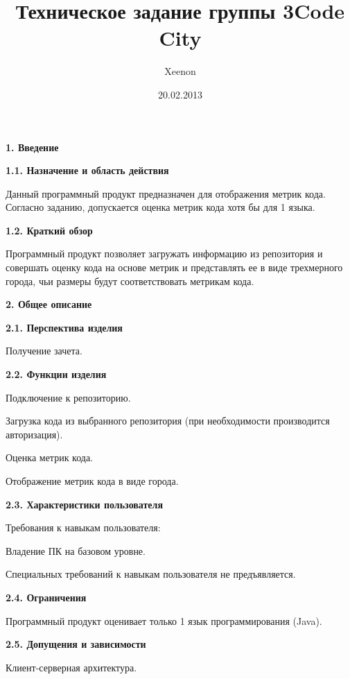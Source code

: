\documentclass[a4paper,12pt]{article}
\title{Техническое задание группы 3\newline Code City }
\date{20.02.2013}
\author{Xeenon}
\begin{document}
\maketitle
\newpage
\textbf{1. Введение}
\newline

	\textbf{1.1. Назначение и область действия}
	
		Данный программный продукт предназначен для отображения метрик кода.
		Согласно заданию, допускается оценка метрик кода хотя бы для 1 языка.
	\newline	

	\textbf{1.2. Краткий обзор}
	
		Программный продукт позволяет загружать информацию из репозитория и совершать оценку кода на основе метрик и представлять ее в виде трехмерного города, 
		чьи размеры будут соответствовать метрикам кода.
\maketitle
\newpage
\textbf{2. Общее описание}
\newline

	\textbf{2.1. Перспектива изделия}
	
		Получение зачета.
		\newline
		
	\textbf{2.2. Функции изделия}
	
		Подключение к репозиторию.
		
		Загрузка кода из выбранного репозитория (при необходимости производится авторизация).
		
		Оценка метрик кода.
		
		Отображение метрик кода в виде города.	
		\newline
		
	\textbf{2.3. Характеристики пользователя}
	
		Требования к навыкам пользователя:
		
		Владение ПК на базовом уровне.
		
		Специальных требований к навыкам пользователя не предъявляется.
		\newline
		
	\textbf{2.4. Ограничения}
	
		Программный продукт оценивает только 1 язык программирования (Java).
		\newline

	\textbf{2.5. Допущения и зависимости}
	
		Клиент-серверная архитектура.
		
\end{document}
